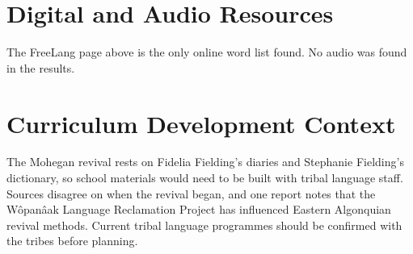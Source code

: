 \documentclass[12pt]{article}
\begin{document}
\section{Digital and Audio Resources}
The FreeLang page above is the only online word list found. No audio was found in the results.

\section{Curriculum Development Context}
The Mohegan revival rests on Fidelia Fielding's diaries and Stephanie Fielding's dictionary, so school materials would need to be built with tribal language staff. Sources disagree on when the revival began, and one report notes that the Wôpanâak Language Reclamation Project has influenced Eastern Algonquian revival methods. Current tribal language programmes should be confirmed with the tribes before planning.
\end{document}
